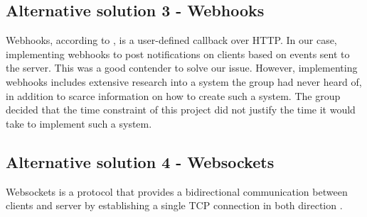 \subsection{Alternative solution 3 - Webhooks}
Webhooks, according to \cite{webhooks}, is a user-defined callback over HTTP. In our case, implementing webhooks to post notifications on clients based on events sent to the server. This was a good contender to solve our issue. However, implementing webhooks includes extensive research into a system the group had never heard of, in addition to scarce information on how to create such a system. The group decided that the time constraint of this project did not justify the time it would take to implement such a system.

\subsection{Alternative solution 4 - Websockets}
Websockets is a protocol that provides a bidirectional communication between clients and server by establishing a single TCP connection in both direction \parencite{rfc_websockets}.  
